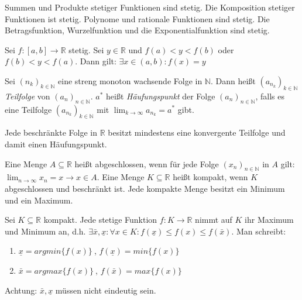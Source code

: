 \documentclass[]{article}
\begin{document}
\begin{satz}
	Summen und Produkte stetiger Funktionen sind stetig. Die Komposition stetiger Funktionen ist stetig. Polynome und rationale Funktionen sind stetig. Die Betragsfunktion, Wurzelfunktion und die Exponentialfunktion sind stetig.
\end{satz}

\begin{satz}[Zwischenwertsatz]
	Sei $f:[a,b] \rightarrow \mathbb{R}$ stetig. Sei $y \in \mathbb{R}$ und $f(a) < y < f(b)$ oder $f(b) < y < f(a)$. Dann gilt: $\exists x \in (a,b) : f(x) = y$
\end{satz}

\begin{satz}
	Sei $(n_k)_{k \in \mathbb{N}}$ eine streng monoton wachsende Folge in $\mathbb{N}$. Dann heißt  $(a_{n_k})_{k \in \mathbb{N}}$ \emph{Teilfolge} von $(a_n)_{n \in \mathbb{N}}$. $a^*$ heißt \emph{Häufungspunkt} der Folge  $(a_n)_{n \in \mathbb{N}}$, falls es eine Teilfolge  $(a_{n_k})_{k \in \mathbb{N}}$ mit $\lim_{k \rightarrow \infty} a_{n_k} = a^*$ gibt.
\end{satz}

\begin{satz}
	Jede beschränkte Folge in $\mathbb{R}$ besitzt mindestens eine konvergente Teilfolge und damit einen Häufungspunkt.
\end{satz}

\begin{definition}
	Eine Menge $A \subseteq \mathbb{R}$ heißt abgeschlossen, wenn für jede Folge $(x_n)_{n \in \mathbb{N}}$ in $A$ gilt: $\lim_{n \rightarrow \infty} x_n = x \rightarrow x\in A$. Eine Menge $K \subseteq \mathbb{R}$ heißt kompakt, wenn $K$ abgeschlossen und beschränkt ist. Jede kompakte Menge besitzt ein Minimum und ein Maximum.
\end{definition}

\begin{satz}
	Sei $K \subseteq \mathbb{R}$ kompakt. Jede stetige Funktion $f : K \rightarrow \mathbb{R}$ nimmt auf $K$ ihr Maximum und Minimum an, d.h. $\exists \bar{x}, \underline{x}: \forall x \in K : f(\underline{x}) \leq f(x) \leq f(\bar{x})$. Man schreibt:
	
	\begin{enumerate}[noitemsep]
		\item $\underline{x} = argmin \{ f(x) \} \medspace$, $f(\underline{x}) = min \{f(x)\}$
		\item $\bar{x} = argmax \{ f(x) \} \medspace$, $f(\bar{x}) = max \{f(x)\}$
	\end{enumerate}

	Achtung: $\bar{x}, \underline{x}$ müssen nicht eindeutig sein.
\end{satz}
\end{document}

